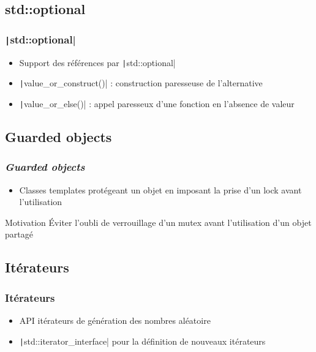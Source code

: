 \documentclass[C++.tex]{subfiles}
\begin{document}
\subsection*{std::optional}
\begin{frame}[fragile]
	\frametitle{\texttt|std::optional|}
	\begin{itemize}
		\item Support des références par \texttt|std::optional|
		\item \texttt|value_or_construct()| : construction paresseuse de l'alternative
		\item \texttt|value_or_else()| : appel paresseux d'une fonction en l'absence de valeur
	\end{itemize}

\end{frame}

\subsection*{Guarded objects}
\begin{frame}[fragile]
	\frametitle{\textit{Guarded objects}}
	\begin{itemize}
		\item Classes templates protégeant un objet en imposant la prise d'un lock avant l'utilisation
	\end{itemize}

	\begin{block}{Motivation}
		Éviter l'oubli de verrouillage d'un mutex avant l'utilisation d'un objet partagé
	\end{block}

\end{frame}

\subsection*{Itérateurs}
\begin{frame}[fragile]
	\frametitle{Itérateurs}
	\begin{itemize}
		\item API \og itérateurs\fg{} de génération des nombres aléatoire
		\item \texttt|std::iterator_interface| pour la définition de nouveaux itérateurs
	\end{itemize}

\end{frame}
\end{document}
